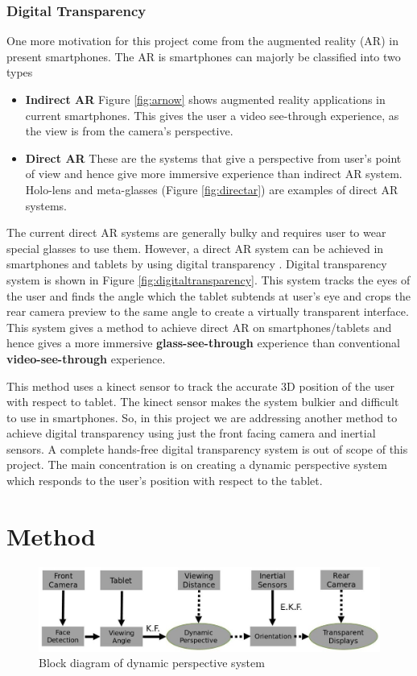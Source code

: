 \documentclass[12pt,twocolumn,letterpaper]{article}
\begin{document}
\subsubsection{Digital Transparency}
One more motivation for this project come from the augmented reality (AR) in present smartphones. The AR is smartphones can majorly be classified into two types
\begin{itemize}
\item \textbf{Indirect AR} Figure \ref{fig:arnow} shows augmented reality applications in current smartphones. This gives the user a video see-through experience, as the view is from the camera's perspective.
\item \textbf{Direct AR} These are the systems that give a perspective from user's point of view and hence give more immersive experience than indirect AR system. Holo-lens and meta-glasses (Figure \ref{fig:directar}) are examples of direct AR systems. 
\end{itemize}

The current direct AR systems are generally bulky and requires user to wear special glasses to use them. However, a direct AR system can be achieved in smartphones and tablets by using digital transparency \cite{jai}. Digital transparency system is shown in Figure \ref{fig:digitaltransparency}. This system tracks the eyes of the user and finds the angle which the tablet subtends at user's eye and crops the rear camera preview to the same angle to create a virtually transparent interface. This system gives a method to achieve direct AR on smartphones/tablets and hence gives a more immersive \textbf{glass-see-through} experience than conventional \textbf{video-see-through} experience.

This method uses a kinect sensor to track the accurate 3D position of the user with respect to tablet. The kinect sensor makes the system bulkier and difficult to use in smartphones. So, in this project we are addressing another method to achieve digital transparency using just the front facing camera and inertial sensors. A complete hands-free digital transparency system is out of scope of this project. The main concentration is on creating a dynamic perspective system which responds to the user's position with respect to the tablet.

\section{Method}
\begin{figure}
\includegraphics[scale=0.21]{images/block}
\caption{Block diagram of dynamic perspective system}
\label{fig:blockdia}
\end{figure}
\end{document}
